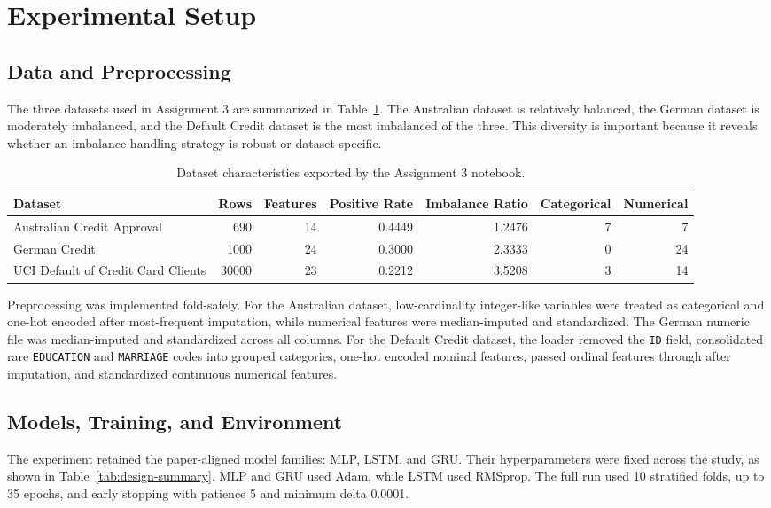 \documentclass[11pt,a4paper]{article}
\begin{document}
\section{Experimental Setup}
\subsection*{Data and Preprocessing}
The three datasets used in Assignment 3 are summarized in Table~\ref{tab:dataset-summary}. The Australian dataset is relatively balanced, the German dataset is moderately imbalanced, and the Default Credit dataset is the most imbalanced of the three. This diversity is important because it reveals whether an imbalance-handling strategy is robust or dataset-specific.

\begin{table}[htbp]
\centering
\scriptsize
\caption{Dataset characteristics exported by the Assignment 3 notebook.}
\label{tab:dataset-summary}
\begin{tabular}{lrrrrrr}
\toprule
Dataset & Rows & Features & Positive Rate & Imbalance Ratio & Categorical & Numerical \\
\midrule
Australian Credit Approval & 690 & 14 & 0.4449 & 1.2476 & 7 & 7 \\
German Credit & 1000 & 24 & 0.3000 & 2.3333 & 0 & 24 \\
UCI Default of Credit Card Clients & 30000 & 23 & 0.2212 & 3.5208 & 3 & 14 \\
\bottomrule
\end{tabular}
\end{table}

Preprocessing was implemented fold-safely. For the Australian dataset, low-cardinality integer-like variables were treated as categorical and one-hot encoded after most-frequent imputation, while numerical features were median-imputed and standardized. The German numeric file was median-imputed and standardized across all columns. For the Default Credit dataset, the loader removed the \texttt{ID} field, consolidated rare \texttt{EDUCATION} and \texttt{MARRIAGE} codes into grouped categories, one-hot encoded nominal features, passed ordinal features through after imputation, and standardized continuous numerical features.

\subsection*{Models, Training, and Environment}
The experiment retained the paper-aligned model families: MLP, LSTM, and GRU. Their hyperparameters were fixed across the study, as shown in Table~\ref{tab:design-summary}. MLP and GRU used Adam, while LSTM used RMSprop. The full run used 10 stratified folds, up to 35 epochs, and early stopping with patience 5 and minimum delta 0.0001.
\end{document}
